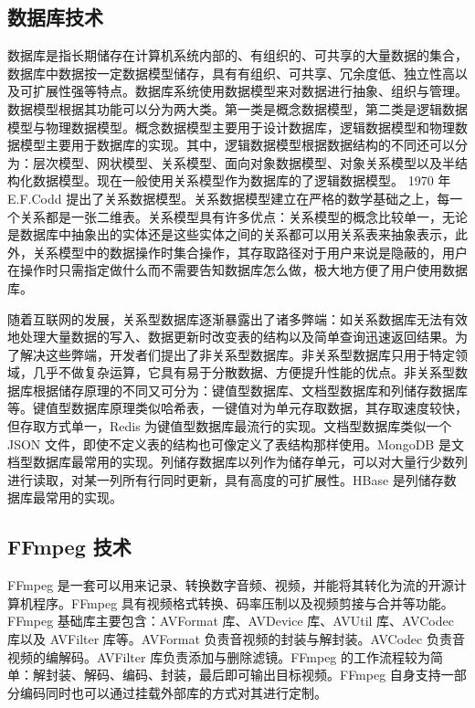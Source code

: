 \subsection{数据库技术}

数据库是指长期储存在计算机系统内部的、有组织的、可共享的大量数据的集合，数据库中数据按一定数据模型储存，具有有组织、可共享、冗余度低、独立性高以及可扩展性强等特点。数据库系统使用数据模型来对数据进行抽象、组织与管理。数据模型根据其功能可以分为两大类。第一类是概念数据模型，第二类是逻辑数据模型与物理数据模型。概念数据模型主要用于设计数据库，逻辑数据模型和物理数据模型主要用于数据库的实现。其中，逻辑数据模型根据数据结构的不同还可以分为：层次模型、网状模型、关系模型、面向对象数据模型、对象关系模型以及半结构化数据模型。现在一般使用关系模型作为数据库的了逻辑数据模型。
1970 年 E.F.Codd 提出了关系数据模型。关系数据模型建立在严格的数学基础之上，每一个关系都是一张二维表。关系模型具有许多优点：关系模型的概念比较单一，无论是数据库中抽象出的实体还是这些实体之间的关系都可以用关系表来抽象表示，此外，关系模型中的数据操作时集合操作，其存取路径对于用户来说是隐蔽的，用户在操作时只需指定做什么而不需要告知数据库怎么做，极大地方便了用户使用数据库。

随着互联网的发展，关系型数据库逐渐暴露出了诸多弊端：如关系数据库无法有效地处理大量数据的写入、数据更新时改变表的结构以及简单查询迅速返回结果。为了解决这些弊端，开发者们提出了非关系型数据库。非关系型数据库只用于特定领域，几乎不做复杂运算，它具有易于分散数据、方便提升性能的优点。非关系型数据库根据储存原理的不同又可分为：键值型数据库、文档型数据库和列储存数据库等。键值型数据库原理类似哈希表，一键值对为单元存取数据，其存取速度较快，但存取方式单一，Redis 为键值型数据库最流行的实现。文档型数据库类似一个 JSON 文件，即使不定义表的结构也可像定义了表结构那样使用。MongoDB 是文档型数据库最常用的实现。列储存数据库以列作为储存单元，可以对大量行少数列进行读取，对某一列所有行同时更新，具有高度的可扩展性。HBase 是列储存数据库最常用的实现。

\subsection{FFmpeg 技术}

FFmpeg 是一套可以用来记录、转换数字音频、视频，并能将其转化为流的开源计算机程序。FFmpeg 具有视频格式转换、码率压制以及视频剪接与合并等功能。FFmpeg 基础库主要包含：AVFormat 库、AVDevice 库、AVUtil 库、AVCodec 库以及 AVFilter 库等。AVFormat 负责音视频的封装与解封装。AVCodec 负责音视频的编解码。AVFilter 库负责添加与删除滤镜。FFmpeg 的工作流程较为简单：解封装、解码、编码、封装，最后即可输出目标视频。FFmpeg 自身支持一部分编码同时也可以通过挂载外部库的方式对其进行定制。


